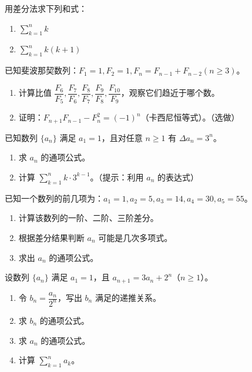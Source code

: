 \documentclass{ctexart}
\begin{document}
\begin{exercise}用差分法求下列和式：
\begin{enumerate}
\item \(\sum_{k=1}^{n} k\)
\item \(\sum_{k=1}^{n} k(k+1)\)
\end{enumerate}
\end{exercise}

\begin{exercise}已知斐波那契数列：\(F_1 = 1, F_2 = 1, F_n = F_{n-1} + F_{n-2} (n \geq 3)\)。
\begin{enumerate}
\item 计算比值 \(\dfrac{F_6}{F_5}, \dfrac{F_7}{F_6}, \dfrac{F_8}{F_7}, \dfrac{F_9}{F_8}, \dfrac{F_{10}}{F_9}\)，观察它们趋近于哪个数。
\item 证明：\(F_{n+1}F_{n-1} - F_n^2 = (-1)^n\)（卡西尼恒等式）。（选做）
\end{enumerate}
\end{exercise}

\begin{exercise}已知数列 \(\{a_n\}\) 满足 \(a_1 = 1\)，且对任意 \(n \geq 1\) 有 \(\Delta a_n = 3^n\)。
\begin{enumerate}
\item 求 \(a_n\) 的通项公式。
\item 计算 \(\sum_{k=1}^{n} k \cdot 3^{k-1}\)。（提示：利用 \(a_n\) 的表达式）
\end{enumerate}
\end{exercise}

\begin{exercise}已知一个数列的前几项为：\(a_1 = 1, a_2 = 5, a_3 = 14, a_4 = 30, a_5 = 55\)。
\begin{enumerate}
\item 计算该数列的一阶、二阶、三阶差分。
\item 根据差分结果判断 \(a_n\) 可能是几次多项式。
\item 求出 \(a_n\) 的通项公式。
\end{enumerate}
\end{exercise}

\begin{exercise}[较难：递推与差分的综合应用]
设数列 \(\{a_n\}\) 满足 \(a_1 = 1\)，且 \(a_{n+1} = 3a_n + 2^n\)（\(n \geq 1\)）。
\begin{enumerate}
\item 令 \(b_n = \dfrac{a_n}{2^n}\)，写出 \(b_n\) 满足的递推关系。
\item 求 \(b_n\) 的通项公式。
\item 求 \(a_n\) 的通项公式。
\item 计算 \(\sum_{k=1}^{n} a_k\)。
\end{enumerate}
\end{exercise}
\end{document}
